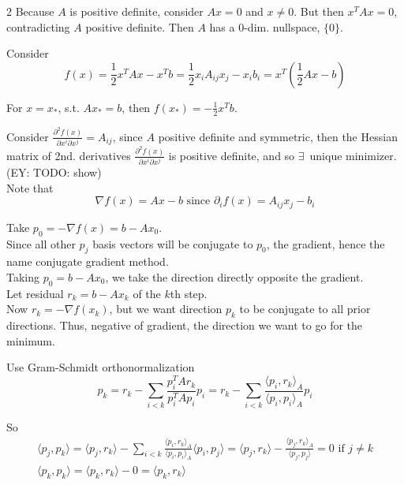 \documentclass[10pt]{amsart}
\begin{document}
\begin{multicols*}{2}
Because $A$ is positive definite, consider $Ax=0$ and $x \neq 0$. But then $x^T Ax= 0$, contradicting $A$ positive definite. Then $A$ has a 0-dim. nullspace, $\lbrace 0 \rbrace$.

Consider
\[
f(x) = \frac{1}{2} x^T Ax - x^T b = \frac{1}{2} x_i A_{ij} x_j - x_i b_i = x^T (\frac{1}{2} Ax  -b)
\]

For $x=x_*$, s.t. $Ax_* =b$, then $f(x_*) = -\frac{1}{2} x^T b$.

Consider $\frac{ \partial^2f(x) }{ \partial x^i \partial x^j} = A_{ij}$, since $A$ positive definite and symmetric, then the Hessian matrix of 2nd. derivatives $\frac{\partial^2 f(x) }{ \partial x^i \partial x^j} $ is positive definite, and so $\exists \, $ unique minimizer. (EY: TODO: show) \\

Note that 
\[
\nabla f(x) = Ax - b \text{ since } \partial_i f(x) = A_{ij} x_j - b_i
\]

Take $p_0 = -\nabla f(x) = b-Ax_0$. \\

Since all other $p_j$ basis vectors will be conjugate to $p_0$, the gradient, hence the name conjugate gradient method. \\

Taking $p_0 = b - Ax_0$, we take the direction directly opposite the gradient. \\

Let residual $r_k = b- Ax_k$ of the $k$th step. \\

Now $r_k = -\nabla f(x_k)$, but we want direction $p_k$ to be conjugate to all prior directions. Thus, negative of gradient, the direction we want to go for the minimum.

Use Gram-Schmidt orthonormalization
\begin{equation}
p_k = r_k - \sum_{i <k } \frac{p_i^T A r_k }{ p_i^T A p_i} p_i = r_k - \sum_{i < k} \frac{ \langle p_i , r_k \rangle_A }{ \langle p_i, p_i \rangle_A } p_i
\end{equation}

So
\[
\begin{gathered}
\langle p_j, p_k \rangle = \langle p_j, r_k \rangle - \sum_{i < k} \frac{ \langle p_i, r_k \rangle_A}{ \langle p_i, p_i \rangle_A } \langle p_i , p_j \rangle = \langle p_j, r_k \rangle - \frac{ \langle p_j, r_k \rangle_A }{ \langle p_j, p_j \rangle } = 0 \text{ if } j \neq k \\
\langle p_k , p_k \rangle = \langle p_k, r_k \rangle - 0 = \langle p_k , r_k \rangle
\end{gathered}
\]


\end{multicols*}
\end{document}
